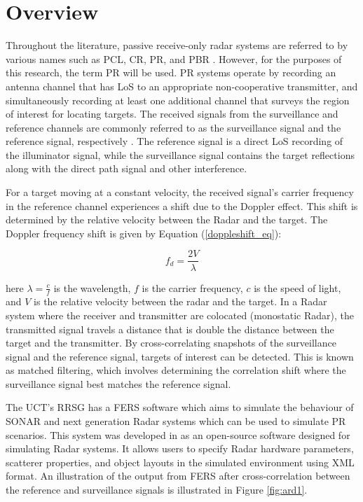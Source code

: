 \section{Overview}
Throughout the literature, passive receive-only radar systems are referred to by various names such as \ac{PCL}, \ac{CR}, \ac{PR}, and \ac{PBR} \cite{Willis2007}. However, for the purposes of this research, the term \ac{PR} will be used. \ac{PR} systems operate by recording an antenna channel that has \ac{LoS} to an appropriate non-cooperative transmitter, and simultaneously recording at least one additional channel that surveys the region of interest for locating targets. The received signals from the surveillance and reference channels are commonly referred to as the surveillance signal and the reference signal, respectively \cite{tong2014}. The reference signal is a direct \ac{LoS} recording of the illuminator signal, while the surveillance signal contains the target reflections along with the direct path signal and other interference.

For a target moving at a constant velocity, the received signal's carrier frequency in the reference channel experiences a shift due to the Doppler effect. This shift is determined by the relative velocity between the \ac{Radar} and the target. The Doppler frequency shift is given by Equation (\ref{doppleshift_eq}):

\begin{equation}
    \ensuremath{f_d} = \frac{2V}{\lambda}
    \label{doppleshift_eq}
\end{equation}

here \(\lambda = \frac{c}{f}\) is the wavelength, \(f\) is the carrier frequency, \(c\) is the speed of light,  and \(V\) is the relative velocity between the radar and the target. In a \ac{Radar} system where the receiver and transmitter are colocated (monostatic \ac{Radar}), the transmitted signal travels a distance that is double the distance between the target and the transmitter. By cross-correlating snapshots of the surveillance signal and the reference signal, targets of interest can be detected. This is known as matched filtering, which involves determining the correlation shift where the surveillance signal best matches the reference signal.

The \ac{UCT}'s \ac{RRSG} has a \ac{FERS} software which aims to simulate the behaviour of \ac{SONAR} and next generation \ac{Radar} systems which can be used to simulate \ac{PR} scenarios. This system was developed in \cite{Goodwin2010} as an open-source software designed for simulating \ac{Radar} systems. It allows users to specify \ac{Radar} hardware parameters, scatterer properties, and object layouts in the simulated environment using XML format. An illustration of the output from \ac{FERS} after cross-correlation between the reference and surveillance signals is illustrated in Figure \ref{fig:ard1}.


